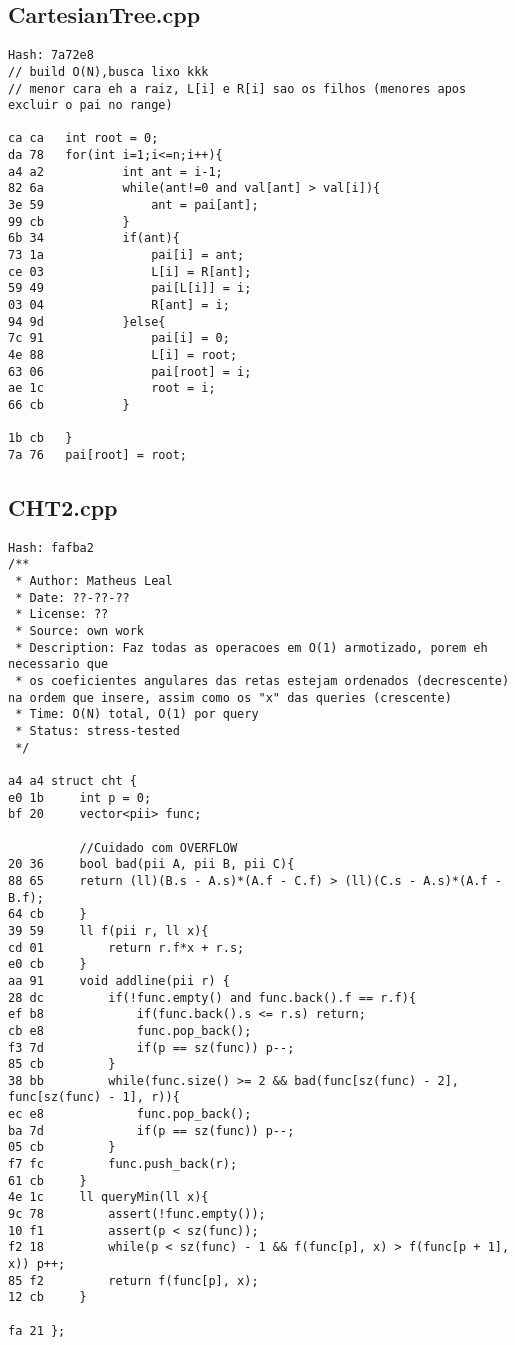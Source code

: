 \documentclass[11pt, a4paper, twoside]{article}
\begin{document}
\subsection{CartesianTree.cpp}
\begin{lstlisting}
Hash: 7a72e8
// build O(N),busca lixo kkk
// menor cara eh a raiz, L[i] e R[i] sao os filhos (menores apos excluir o pai no range)

ca ca 	int root = 0;
da 78 	for(int i=1;i<=n;i++){
a4 a2 			int ant = i-1;
82 6a 			while(ant!=0 and val[ant] > val[i]){
3e 59 				ant = pai[ant];
99 cb 			}
6b 34 			if(ant){
73 1a 				pai[i] = ant;
ce 03 				L[i] = R[ant];
59 49 				pai[L[i]] = i;
03 04 				R[ant] = i;
94 9d 			}else{
7c 91 				pai[i] = 0;
4e 88 				L[i] = root;
63 06 				pai[root] = i;
ae 1c 				root = i;
66 cb 			}
      			
1b cb 	}
7a 76 	pai[root] = root;
\end{lstlisting}

\subsection{CHT2.cpp}
\begin{lstlisting}
Hash: fafba2
/**
 * Author: Matheus Leal
 * Date: ??-??-??
 * License: ??
 * Source: own work
 * Description: Faz todas as operacoes em O(1) armotizado, porem eh necessario que
 * os coeficientes angulares das retas estejam ordenados (decrescente) na ordem que insere, assim como os "x" das queries (crescente)
 * Time: O(N) total, O(1) por query
 * Status: stress-tested
 */

a4 a4 struct cht {
e0 1b     int p = 0;
bf 20     vector<pii> func;
          
          //Cuidado com OVERFLOW
20 36     bool bad(pii A, pii B, pii C){
88 65     return (ll)(B.s - A.s)*(A.f - C.f) > (ll)(C.s - A.s)*(A.f - B.f);
64 cb     }
39 59     ll f(pii r, ll x){
cd 01         return r.f*x + r.s;
e0 cb     }
aa 91     void addline(pii r) {
28 dc         if(!func.empty() and func.back().f == r.f){
ef b8             if(func.back().s <= r.s) return;
cb e8             func.pop_back();
f3 7d             if(p == sz(func)) p--;
85 cb         }
38 bb         while(func.size() >= 2 && bad(func[sz(func) - 2], func[sz(func) - 1], r)){
ec e8             func.pop_back();
ba 7d             if(p == sz(func)) p--;
05 cb         }
f7 fc         func.push_back(r);
61 cb     }
4e 1c     ll queryMin(ll x){
9c 78         assert(!func.empty());
10 f1         assert(p < sz(func));
f2 18         while(p < sz(func) - 1 && f(func[p], x) > f(func[p + 1], x)) p++;
85 f2         return f(func[p], x);
12 cb     }
      
fa 21 };
\end{lstlisting}
\end{document}
